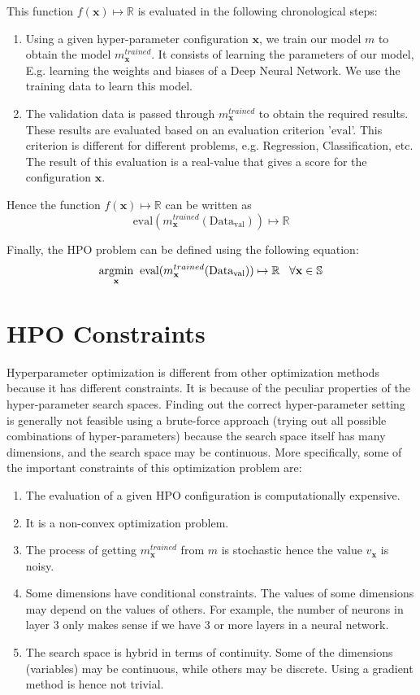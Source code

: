\documentclass[11pt]{report}
\begin{document}
This function $f(\textbf{x}) \mapsto \mathbb{R}$ is evaluated in the following chronological steps:
\begin{enumerate}
\item Using a given hyper-parameter configuration $\textbf{x}$,  we train our model $m$ to obtain the model $m^{trained}_\textbf{x}$. It consists of learning the parameters of our model, E.g. learning the weights and biases of a Deep Neural Network.
We use the training data to learn this model.
\item The validation data is passed through $m^{trained}_\textbf{x}$ to obtain the required results.
These results are evaluated based on an evaluation criterion '$\textrm{eval}$'. This criterion is different for different problems, e.g. Regression, Classification, etc.
The result of this evaluation is a real-value that gives a score for the configuration $\textbf{x}$.
\end{enumerate}

Hence the function $f(\textbf{x}) \mapsto \mathbb{R}$ can be written as 
$$
\textrm{eval}(m^{trained}_\textbf{x} (\textrm{Data}_\textrm{val})) \mapsto \mathbb{R}
$$

Finally, the HPO problem can be defined using the following equation:
$$
\underset{\rm \textbf{x}}{\rm argmin} \;\; \textrm{eval}(m^{trained}_\textbf{x} (\textrm{Data}_\textrm{val})) \mapsto \mathbb{R}   \;\;\;  \forall \textbf{x} \in \mathbb{S}
$$

\label{ProblemOverviewlabel}
\section{HPO Constraints}

Hyperparameter optimization is different from other optimization methods because it has different constraints.
It is because of the peculiar properties of the hyper-parameter search spaces.
Finding out the correct hyper-parameter setting is generally not feasible using a brute-force approach (trying out all possible combinations of hyper-parameters) because the search space itself has many dimensions, and the search space may be continuous.
More specifically,  some of the important constraints of this optimization problem are:

\begin{enumerate}
\item The evaluation of a given HPO configuration is computationally expensive.
\item It is a non-convex optimization problem.
\item The process of getting $m^{trained}_\textbf{x}$ from $m$ is stochastic hence the value $v_{\textbf{x}}$ is noisy.
\item Some dimensions have conditional constraints. The values of some dimensions may depend on the values of others. For example, the number of neurons in layer 3 only makes sense if we have 3 or more layers in a neural network.
\item The search space is hybrid in terms of continuity. Some of the dimensions (variables) may be continuous, while others may be discrete.
Using a gradient method is hence not trivial.
\end{enumerate}
\end{document}
